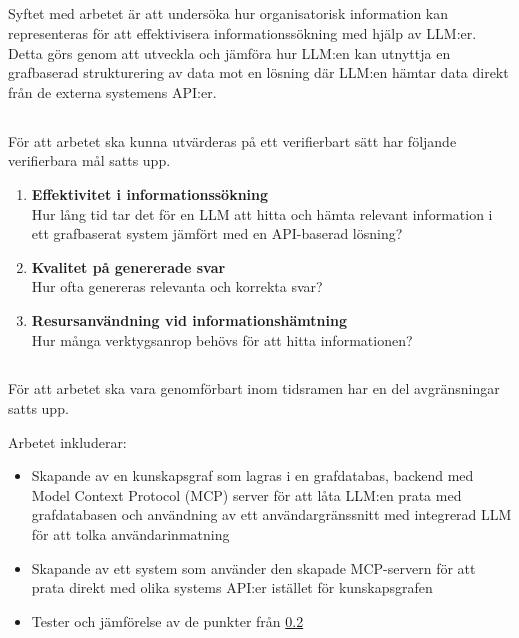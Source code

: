 \subsection{}\label{subsec:aim}
\noindent

Syftet med arbetet är att undersöka hur organisatorisk information kan representeras för att effektivisera informationssökning med hjälp av LLM:er.
Detta görs genom att utveckla och jämföra hur LLM:en kan utnyttja en grafbaserad strukturering av data mot en lösning där LLM:en hämtar data direkt från de externa systemens API:er.

\subsection{}\label{subsec:researchquestion}
För att arbetet ska kunna utvärderas på ett verifierbart sätt har följande verifierbara mål satts upp.

\begin{enumerate}
  \item \textbf{Effektivitet i informationssökning } \\
   Hur lång tid tar det för en LLM att hitta och hämta relevant information i ett grafbaserat system jämfört med en API-baserad lösning?
  \item \textbf{Kvalitet på genererade svar} \\
   Hur ofta genereras relevanta och korrekta svar?
  \item \textbf{Resursanvändning vid informationshämtning} \\
   Hur många verktygsanrop behövs för att hitta informationen?
\end{enumerate}

\subsection{}\label{subsec:scope}
\noindent
För att arbetet ska vara genomförbart inom tidsramen har en del avgränsningar satts upp.

Arbetet inkluderar:
\begin{itemize}
  \item {Skapande av en kunskapsgraf som lagras i en grafdatabas, backend med Model Context Protocol (MCP) server för att låta LLM:en prata med grafdatabasen och användning av ett användargränssnitt med integrerad LLM för att tolka användarinmatning}
  \item {Skapande av ett system som använder den skapade MCP-servern för att prata direkt med olika systems API:er istället för kunskapsgrafen}
  \item {Tester och jämförelse av de punkter från \ref{subsec:researchquestion}}
\end{itemize}

